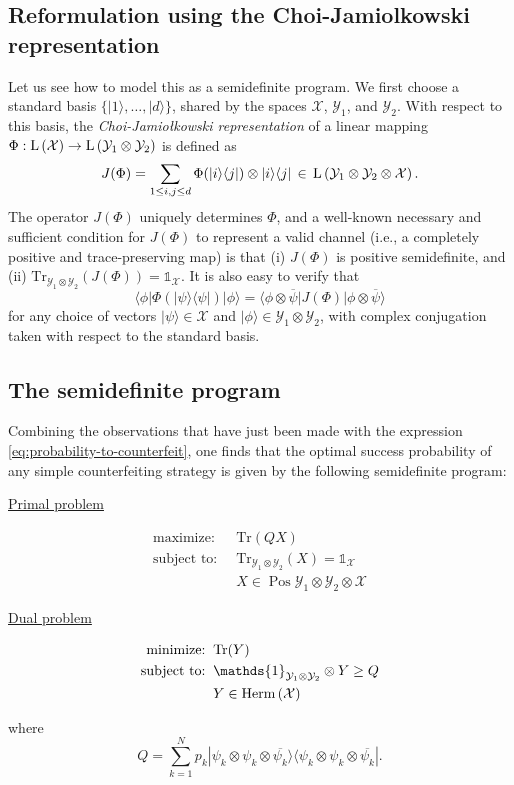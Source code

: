 \documentclass[11pt, letterpaper]{article}
\theoremstyle{remark}
\theoremstyle{definition}
\numberwithin{equation}{section}
\newcommand{\setft}[1]{\textnormal{#1}}
\newcommand{\1}{\mathbb{1}}
\newcommand{\tr}{\mathrm{Tr}}
\DeclareMathOperator{\pos}{Pos}
\def\I{\mathds{1}}
\newcommand{\herm}[1]{\setft{Herm}\left(#1\right)}
\newcommand{\ket}[1]{|#1\rangle}
\newcommand{\bra}[1]{\langle#1|}
\newcommand{\lin}[1]{\setft{L}\left(#1\right)}
\def\X{\mathcal{X}}
\def\Y{\mathcal{Y}}
\begin{document}
\subsection{Reformulation using the Choi-Jamiolkowski representation}

Let us see how to model this as a semidefinite program. 
We first choose a standard basis $\{\ket{1},\ldots,\ket{d}\}$,
shared by the spaces $\X$, $\Y_1$, and $\Y_2$.
With respect to this basis, the 
\emph{Choi-Jamio{\l}kowski representation} of a linear mapping
$\Phi:\lin{\X}\rightarrow\lin{\Y_1\otimes\Y_2}$ is defined as
\[
J(\Phi) = \sum_{1\leq i,j\leq d} \Phi(\ket{i}\bra{j}) \otimes
\ket{i}\bra{j}\,\in\,\lin{\Y_1\otimes\Y_2\otimes\X}.
\]
The operator $J(\Phi)$ uniquely determines $\Phi$, and a well-known
necessary and sufficient condition for $J(\Phi)$ to represent a valid 
channel (i.e., a completely positive and trace-preserving map) is that
(i) $J(\Phi)$ is positive semidefinite, and 
(ii) $\tr_{\Y_1\otimes\Y_2}(J(\Phi)) = \I_{\X}$.
It is also  easy to verify that
\[
\bra{\phi} \Phi(\ket{\psi}\bra{\psi}) \ket{\phi}
= \bra{\phi \otimes \overline{\psi}} J(\Phi)\ket{\phi \otimes
  \overline{\psi}}
\]
for any choice of vectors $\ket{\psi}\in\X$ and
$\ket{\phi}\in\Y_1\otimes\Y_2$, with
complex conjugation taken with respect to the standard basis.

\subsection{The semidefinite program}

Combining the observations that have just been made with the
expression \eqref{eq:probability-to-counterfeit}, one finds that the
optimal success probability of any simple counterfeiting strategy is
given by the following semidefinite program:\vspace{2mm}
\begin{center}
\begin{minipage}{0.5\textwidth}
  \centerline{\underline{Primal problem}}\vspace{-6mm}
  \begin{align*}
    \text{maximize:}\;\; & \tr(Q X)\\
    \text{subject to:}\;\; & \tr_{\Y_1\otimes\Y_2}(X) = \I_{\X}\\
    & X\in\pos{\Y_1\otimes\Y_2\otimes\X}
  \end{align*}
\end{minipage}\hspace*{5mm}
\begin{minipage}{0.4\textwidth}
  \centerline{\underline{Dual problem}}\vspace{-6mm}
  \begin{align*}
    \text{minimize:}\;\; & \tr(Y)\\
    \text{subject to:}\;\; & \I_{\Y_1\otimes\Y_2}\otimes Y \geq Q\\
    & Y \in \herm{\X}
  \end{align*}
\end{minipage}
\end{center}
where
\[
Q = \sum_{k = 1}^N p_k
\ket{\psi_k \otimes \psi_k \otimes \overline{\psi_k}}
\bra{\psi_k \otimes \psi_k \otimes \overline{\psi_k}}.
\]
\end{document}
